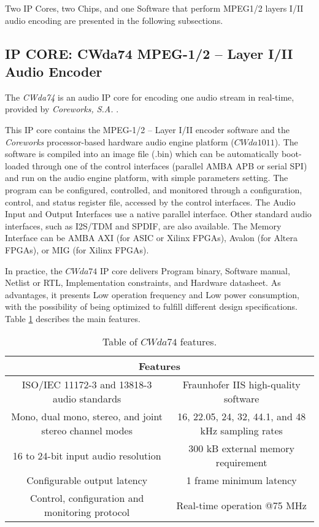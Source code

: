 Two IP Cores, two Chips, and one Software that perform MPEG1/2 layers I/II audio encoding are presented in the following subsections.

\subsection{IP CORE: CWda74 MPEG-1/2 – Layer I/II Audio Encoder}

The \textit{CWda74} \cite{CWda74} is an audio IP core for encoding one audio stream in real-time, provided by \textit{Coreworks, S.A.} \cite{coreworks}.

This IP core contains the MPEG-1/2 – Layer I/II encoder software and the \textit{Coreworks} processor-based hardware audio engine platform ($CWda1011$).
The software is compiled into an image file (.bin) which can be automatically boot-loaded through one of the control interfaces (parallel AMBA APB or serial SPI) and run on the audio engine platform, with simple parameters setting.
The program can be configured, controlled, and monitored through a configuration, control, and status register file, accessed by the control interfaces. The Audio Input and Output Interfaces use a native parallel interface. Other standard audio interfaces, such as I2S/TDM and SPDIF, are also available.
The Memory Interface can be AMBA AXI (for ASIC or Xilinx \cite{xilinx} FPGAs), Avalon (for Altera \cite{intel} FPGAs), or MIG (for Xilinx FPGAs).

In practice, the $CWda74$ IP core delivers Program binary, Software manual, Netlist or RTL, Implementation constraints, and Hardware datasheet.
As advantages, it presents Low operation frequency and Low power consumption, with the possibility of being optimized to fulfill different design specifications.
Table \ref{coreworks} describes the main features.

\begin{table}[h]
    \centering
    \begin{tabular}{|c|c|}
        \hline
        \multicolumn{2}{|c|}{\textbf{Features}} \\
        \hline
         ISO/IEC 11172-3 and 13818-3 audio standards & Fraunhofer IIS high-quality software \\
         \hline
         Mono, dual mono, stereo, and joint stereo channel modes & 16, 22.05, 24, 32, 44.1, and 48 kHz sampling rates \\
         \hline
         16 to 24-bit input audio resolution & 300 kB external memory requirement\\
         \hline
         Configurable output latency & 1 frame minimum latency\\
         \hline
         Control, configuration and monitoring protocol & Real-time operation @75 MHz \\
         \hline
    \end{tabular}
    \caption{Table of $CWda74$ features.}
    \label{coreworks}
\end{table}

